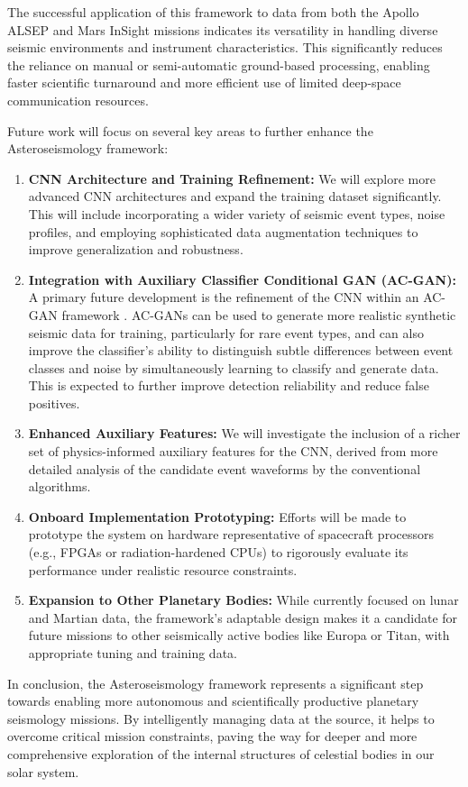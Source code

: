 \documentclass[conference]{IEEEtran}
\begin{document}
The successful application of this framework to data from both the Apollo ALSEP and Mars InSight missions indicates its versatility in handling diverse seismic environments and instrument characteristics. This significantly reduces the reliance on manual or semi-automatic ground-based processing, enabling faster scientific turnaround and more efficient use of limited deep-space communication resources.

Future work will focus on several key areas to further enhance the Asteroseismology framework:
\begin{enumerate}
    \item \textbf{CNN Architecture and Training Refinement:} We will explore more advanced CNN architectures and expand the training dataset significantly. This will include incorporating a wider variety of seismic event types, noise profiles, and employing sophisticated data augmentation techniques to improve generalization and robustness.
    \item \textbf{Integration with Auxiliary Classifier Conditional GAN (AC-GAN):} A primary future development is the refinement of the CNN within an AC-GAN framework \cite{b22}. AC-GANs can be used to generate more realistic synthetic seismic data for training, particularly for rare event types, and can also improve the classifier's ability to distinguish subtle differences between event classes and noise by simultaneously learning to classify and generate data. This is expected to further improve detection reliability and reduce false positives.
    \item \textbf{Enhanced Auxiliary Features:} We will investigate the inclusion of a richer set of physics-informed auxiliary features for the CNN, derived from more detailed analysis of the candidate event waveforms by the conventional algorithms.
    \item \textbf{Onboard Implementation Prototyping:} Efforts will be made to prototype the system on hardware representative of spacecraft processors (e.g., FPGAs or radiation-hardened CPUs) to rigorously evaluate its performance under realistic resource constraints.
    \item \textbf{Expansion to Other Planetary Bodies:} While currently focused on lunar and Martian data, the framework's adaptable design makes it a candidate for future missions to other seismically active bodies like Europa or Titan, with appropriate tuning and training data.
\end{enumerate}

In conclusion, the Asteroseismology framework represents a significant step towards enabling more autonomous and scientifically productive planetary seismology missions. By intelligently managing data at the source, it helps to overcome critical mission constraints, paving the way for deeper and more comprehensive exploration of the internal structures of celestial bodies in our solar system.
\end{document}
